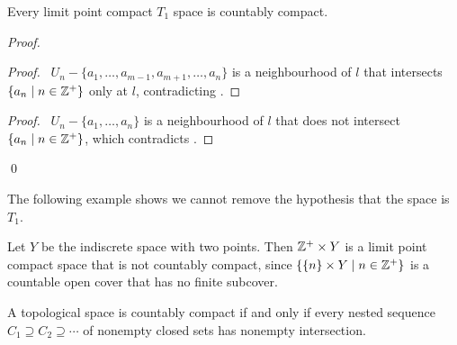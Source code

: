\begin{proposition}[AC]
    Every limit point compact $T_1$ space is countably compact.
\end{proposition}

\begin{proof}
    \pf
    \begin{proof}
        \pf\ $U_n - \{ a_1, \ldots, a_{m-1}, a_{m+1}, \ldots, a_n \}$
        is a neighbourhood of $l$ that intersects $\{ a_n \mid n \in \mathbb{Z}^+ \}$
        only at $l$, contradicting .
    \end{proof}
    \begin{proof}
        \pf\ $U_n - \{ a_1, \ldots, a_n \}$ is a neighbourhood of $l$ that does not intersect $\{ a_n \mid n \in \mathbb{Z}^+ \}$,
        which contradicts .
    \end{proof}
    \qed
\end{proof}

The following example shows we cannot remove the hypothesis that the space is $T_1$.

\begin{example}
    Let $Y$ be the indiscrete space with two points. Then $\mathbb{Z}^+ \times Y$
    is a limit point compact space that is not countably compact,
    since $\{ \{n\} \times Y \mid n \in \mathbb{Z}^+ \}$ is a countable open
    cover that has no finite subcover.
\end{example}

\begin{proposition}
    \label{proposition:nested_sequence_nonempty_intersection}
    A topological space is countably compact if and only if every nested sequence
    $C_1 \supseteq C_2 \supseteq \cdots$ of nonempty closed sets has nonempty intersection.
\end{proposition}

